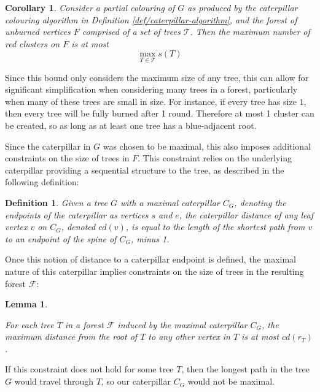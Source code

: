 \documentclass{mpaper}
\newtheorem{definition}[theorem]{Definition}
\newtheorem{corollary}[theorem]{Corollary}
\newtheorem{lemma}[theorem]{Lemma}
\begin{document}
\begin{corollary}
\label{cor/root-diameter-bound-1}
Consider a partial colouring of $G$ as produced by the caterpillar colouring algorithm in Definition \ref{def/caterpillar-algorithm}, and the forest of unburned vertices $F$ comprised of a set of trees $\mathcal{T}$. Then the maximum number of red clusters on $F$ is at most $$\max_{T \in \mathcal{T}} s(T)$$
\end{corollary}

Since this bound only considers the maximum size of any tree, this can allow for significant simplification when considering many trees in a forest, particularly when many of these trees are small in size. For instance, if every tree has size $1$, then every tree will be fully burned after 1 round. Therefore at most 1 cluster can be created, so as long as at least one tree has a blue-adjacent root.

Since the caterpillar in $G$ was chosen to be maximal, this also imposes additional constraints on the size of trees in $F$. This constraint relies on the underlying caterpillar providing a sequential structure to the tree, as described in the following definition:

\begin{definition}
\label{def/tree-distance}
Given a tree $G$ with a maximal caterpillar $C_G$, denoting the endpoints of the caterpillar as vertices $s$ and $e$, the \emph{caterpillar distance} of any leaf vertex $v$ on $C_G$, denoted $cd(v)$, is equal to the length of the shortest path from $v$ to an endpoint of the spine of $C_G$, minus 1.
\end{definition}

Once this notion of distance to a caterpillar endpoint is defined, the maximal nature of this caterpillar implies constraints on the size of trees in the resulting forest $\mathcal{F}$:

\begin{lemma}
\label{def/tree-size-constraint}

For each tree $T$ in a forest $\mathcal{F}$ induced by the maximal caterpillar $C_G$, the maximum distance from the root of $T$ to any other vertex in $T$ is at most $cd(r_T)$.

\end{lemma}

If this constraint does not hold for some tree $T$, then the longest path in the tree $G$ would travel through $T$, so our caterpillar $C_G$ would not be maximal.
\end{document}

